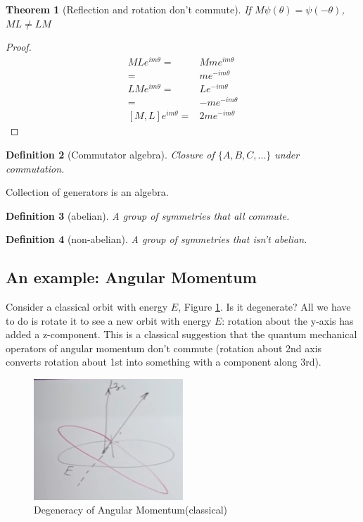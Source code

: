 \documentclass[]{article}
\newtheorem{thm}{Theorem}
\newtheorem{defn}[thm]{Definition}
\begin{document}
\begin{thm}[Reflection and rotation don't commute]
	If $M\psi(\theta) = \psi(-\theta)$, $ML \ne LM$
\end{thm}
\begin{proof}
	\begin{align*}
	MLe^{i m \theta} =& M m e^{i m \theta}\\
	=&m e^{- i m \theta}\\
	LMe^{i m \theta} =& L e^{- i m \theta}\\
	=& -m e^{- i m \theta}\\
	[M,L]e^{im\theta}=&2m e^{- i m \theta}
	\end{align*}
\end{proof}





\begin{defn}[Commutator algebra]
	Closure of $\{A,B,C,...\}$ under commutation.
\end{defn}

Collection of generators is an algebra.

\begin{defn}[abelian]
	A group of symmetries that all commute.
\end{defn}

\begin{defn}[non-abelian]
	A group of symmetries that isn't abelian.
\end{defn}

\subsection{An example: Angular Momentum}

Consider a classical orbit with energy $E$, Figure \ref{eq:aqm-2-1}. 	Is it degenerate? All we have to do is rotate it to see a new orbit with energy $E$: rotation about the y-axis has added a z-component. This is a classical suggestion that the quantum mechanical operators of angular momentum don't commute (rotation about 2nd axis converts rotation about 1st into something with a component along 3rd).

\begin{figure}[H]
	\begin{center}
		\caption{Degeneracy of Angular Momentum(classical)}\label{eq:aqm-2-1}
		\includegraphics[width=0.5\textwidth]{aqm-2-1}
	\end{center}
\end{figure}
\end{document}

